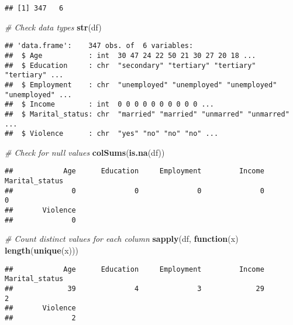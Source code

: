 \documentclass[
]{article}
\newenvironment{Shaded}{\begin{snugshade}}{\end{snugshade}}
\newcommand{\CommentTok}[1]{\textcolor[rgb]{0.56,0.35,0.01}{\textit{#1}}}
\newcommand{\ControlFlowTok}[1]{\textcolor[rgb]{0.13,0.29,0.53}{\textbf{#1}}}
\newcommand{\FunctionTok}[1]{\textcolor[rgb]{0.13,0.29,0.53}{\textbf{#1}}}
\newcommand{\NormalTok}[1]{#1}
\begin{document}
\begin{verbatim}
## [1] 347   6
\end{verbatim}

\begin{Shaded}
\begin{Highlighting}[]
\CommentTok{\# Check data types}
\FunctionTok{str}\NormalTok{(df)}
\end{Highlighting}
\end{Shaded}

\begin{verbatim}
## 'data.frame':    347 obs. of  6 variables:
##  $ Age           : int  30 47 24 22 50 21 30 27 20 18 ...
##  $ Education     : chr  "secondary" "tertiary" "tertiary" "tertiary" ...
##  $ Employment    : chr  "unemployed" "unemployed" "unemployed" "unemployed" ...
##  $ Income        : int  0 0 0 0 0 0 0 0 0 0 ...
##  $ Marital_status: chr  "married" "married" "unmarred" "unmarred" ...
##  $ Violence      : chr  "yes" "no" "no" "no" ...
\end{verbatim}

\begin{Shaded}
\begin{Highlighting}[]
\CommentTok{\# Check for null values}
\FunctionTok{colSums}\NormalTok{(}\FunctionTok{is.na}\NormalTok{(df))}
\end{Highlighting}
\end{Shaded}

\begin{verbatim}
##            Age      Education     Employment         Income Marital_status 
##              0              0              0              0              0 
##       Violence 
##              0
\end{verbatim}

\begin{Shaded}
\begin{Highlighting}[]
\CommentTok{\# Count distinct values for each column}
\FunctionTok{sapply}\NormalTok{(df, }\ControlFlowTok{function}\NormalTok{(x) }\FunctionTok{length}\NormalTok{(}\FunctionTok{unique}\NormalTok{(x)))}
\end{Highlighting}
\end{Shaded}

\begin{verbatim}
##            Age      Education     Employment         Income Marital_status 
##             39              4              3             29              2 
##       Violence 
##              2
\end{verbatim}
\end{document}
